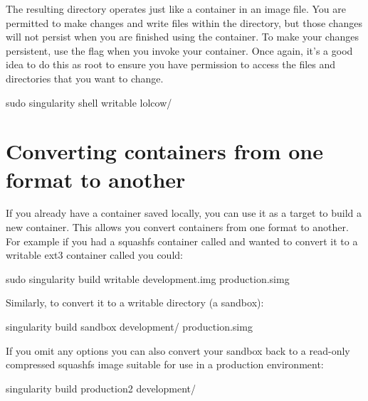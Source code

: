 \documentclass[letterpaper,10pt,english]{sphinxmanual}
\begin{document}
The resulting directory operates just like a container in an image
file. You are permitted to make changes and write files within the
directory, but those changes will not persist when you are finished
using the container. To make your changes persistent, use the  flag
when you invoke your container.
Once again, it’s a good idea to do this as root to ensure you have
permission to access the files and directories that you want to
change.

%
\begin{sphinxVerbatim}[commandchars=\\\{\}]
\PYGZdl{} sudo singularity shell \PYGZhy{}\PYGZhy{}writable lolcow/
\end{sphinxVerbatim}


\section{Converting containers from one format to another}
\label{\detokenize{build_a_container:converting-containers-from-one-format-to-another}}
If you already have a container saved locally, you can use it as a
target to build a new container. This allows you convert containers from
one format to another. For example if you had a squashfs container
called  and wanted to convert it to a writable ext3 container called  you
could:

%
\begin{sphinxVerbatim}[commandchars=\\\{\}]
\PYGZdl{} sudo singularity build \PYGZhy{}\PYGZhy{}writable development.img production.simg
\end{sphinxVerbatim}

Similarly, to convert it to a writable directory (a sandbox):

%
\begin{sphinxVerbatim}[commandchars=\\\{\}]
\PYGZdl{} singularity build \PYGZhy{}\PYGZhy{}sandbox development/ production.simg
\end{sphinxVerbatim}

If you omit any options you can also convert your sandbox back to a
read-only compressed squashfs image suitable for use in a production
environment:

%
\begin{sphinxVerbatim}[commandchars=\\\{\}]
\PYGZdl{} singularity build production2 development/
\end{sphinxVerbatim}
\end{document}

